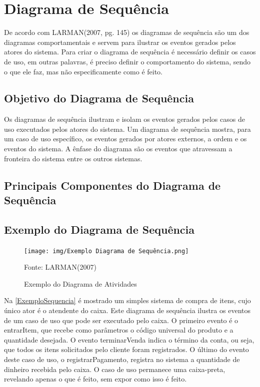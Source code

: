 \documentclass[12pt,openright,oneside,a4paper,
	chapter=TITLE,
	section=TITLE,
	english,brazil]{abntex2}
\begin{document}
\chapter{Diagrama de Sequência}

De acordo com LARMAN(2007, pg. 145) os diagramas de sequência são um dos diagramas comportamentais e servem para ilustrar os eventos gerados pelos atores do sistema. Para criar o diagrama de sequência é necessário definir os casos de uso, em outras palavras, é preciso definir o comportamento do sistema, sendo o que ele faz, mas não especificamente como é feito.

\section{Objetivo do Diagrama de Sequência}

Os diagramas de sequência ilustram e isolam os eventos gerados pelos casos de uso executados pelos atores do sistema. Um diagrama de sequência mostra, para um caso de uso específico, os eventos gerados por atores externos, a ordem e os eventos do sistema. A ênfase do diagrama são os eventos que atravessam a fronteira do sistema entre os outros sistemas.

\section{Principais Componentes do Diagrama de Sequência}

\section{Exemplo do Diagrama de Sequência}

\begin{figure}[!htp]
	\caption{Exemplo do Diagrama de Atividades}
	\centering
	\texttt{[image: img/Exemplo Diagrama de Sequência.png]}
	\\

	\label{ExemploSequencia}
	\footnotesize\raggedright Fonte: LARMAN(2007)
\end{figure}

Na \autoref{ExemploSequencia} é mostrado um simples sistema de compra de itens, cujo único ator é o atendente do caixa. Este diagrama de sequência ilustra os eventos de um caso de uso que pode ser executado pelo caixa. O primeiro evento é o entrarItem, que recebe como parâmetros o código universal do produto e a quantidade desejada. O evento terminarVenda indica o término da conta, ou seja, que todos os itens solicitados pelo cliente foram registrados. O último do evento deste caso de uso, o registrarPagamento, registra no sistema a quantidade de dinheiro recebida pelo caixa.  O caso de uso permanece uma caixa-preta, revelando apenas o que é feito, sem expor como isso é feito.
\end{document}
